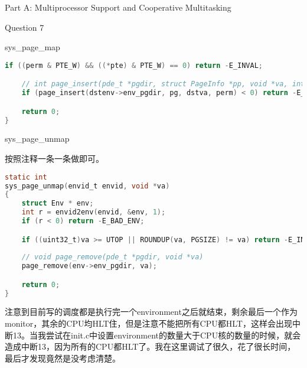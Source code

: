 \documentclass[GBK,winfonts,a4paper,10pt]{ctexart}
\begin{document}
\begin{section}{Part A: Multiprocessor Support and Cooperative Multitasking}
\begin{subsection}{Question 7}
\begin{subsubsection}{sys\_page\_map}
\begin{lstlisting}[language=C]
	if ((perm & PTE_W) && ((*pte) & PTE_W) == 0) return -E_INVAL;

	// int page_insert(pde_t *pgdir, struct PageInfo *pp, void *va, int perm)
	if (page_insert(dstenv->env_pgdir, pg, dstva, perm) < 0) return -E_NO_MEM;

	return 0;
}
\end{lstlisting}
\end{subsubsection}

\begin{subsubsection}{sys\_page\_unmap}
\par
按照注释一条一条做即可。
\begin{lstlisting}[language=C]
static int
sys_page_unmap(envid_t envid, void *va)
{
	struct Env * env;
	int r = envid2env(envid, &env, 1);
	if (r < 0) return -E_BAD_ENV;

	if ((uint32_t)va >= UTOP || ROUNDUP(va, PGSIZE) != va) return -E_INVAL;
	
	// void page_remove(pde_t *pgdir, void *va)
	page_remove(env->env_pgdir, va);

	return 0;
}
\end{lstlisting}	
\end{subsubsection}

\par
注意到目前写的调度都是执行完一个environment之后就结束，剩余最后一个作为monitor，其余的CPU均HLT住，但是注意不能把所有CPU都HLT，这样会出现中断13。当我尝试在init.c中设置environment的数量大于CPU核的数量的时候，就会造成中断13，因为所有的CPU都HLT了。我在这里调试了很久，花了很长时间，最后才发现竟然是没考虑清楚。
\end{subsection}

\end{section}
\end{document}

